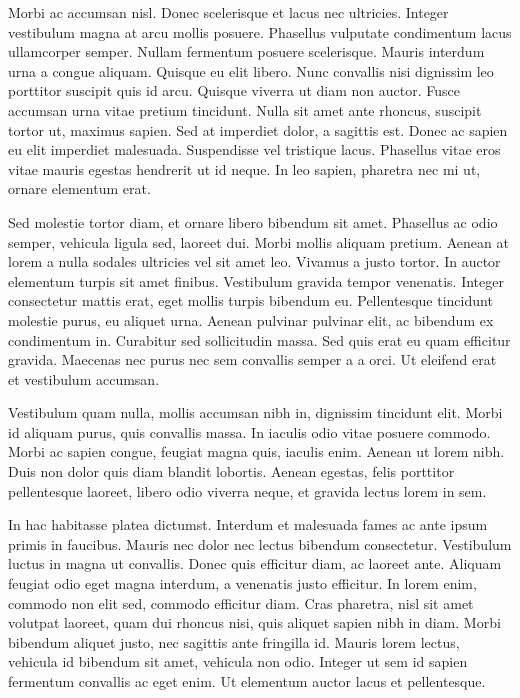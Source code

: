 Morbi ac accumsan nisl. Donec scelerisque et lacus nec ultricies. Integer vestibulum magna at arcu mollis posuere. Phasellus vulputate condimentum lacus ullamcorper semper. Nullam fermentum posuere scelerisque. Mauris interdum urna a congue aliquam. Quisque eu elit libero. Nunc convallis nisi dignissim leo porttitor suscipit quis id arcu. Quisque viverra ut diam non auctor. Fusce accumsan urna vitae pretium tincidunt. Nulla sit amet ante rhoncus, suscipit tortor ut, maximus sapien. Sed at imperdiet dolor, a sagittis est. Donec ac sapien eu elit imperdiet malesuada. Suspendisse vel tristique lacus. Phasellus vitae eros vitae mauris egestas hendrerit ut id neque. In leo sapien, pharetra nec mi ut, ornare elementum erat.

Sed molestie tortor diam, et ornare libero bibendum sit amet. Phasellus ac odio semper, vehicula ligula sed, laoreet dui. Morbi mollis aliquam pretium. Aenean at lorem a nulla sodales ultricies vel sit amet leo. Vivamus a justo tortor. In auctor elementum turpis sit amet finibus. Vestibulum gravida tempor venenatis. Integer consectetur mattis erat, eget mollis turpis bibendum eu. Pellentesque tincidunt molestie purus, eu aliquet urna. Aenean pulvinar pulvinar elit, ac bibendum ex condimentum in. Curabitur sed sollicitudin massa. Sed quis erat eu quam efficitur gravida. Maecenas nec purus nec sem convallis semper a a orci. Ut eleifend erat et vestibulum accumsan.

Vestibulum quam nulla, mollis accumsan nibh in, dignissim tincidunt elit. Morbi id aliquam purus, quis convallis massa. In iaculis odio vitae posuere commodo. Morbi ac sapien congue, feugiat magna quis, iaculis enim. Aenean ut lorem nibh. Duis non dolor quis diam blandit lobortis. Aenean egestas, felis porttitor pellentesque laoreet, libero odio viverra neque, et gravida lectus lorem in sem.

In hac habitasse platea dictumst. Interdum et malesuada fames ac ante ipsum primis in faucibus. Mauris nec dolor nec lectus bibendum consectetur. Vestibulum luctus in magna ut convallis. Donec quis efficitur diam, ac laoreet ante. Aliquam feugiat odio eget magna interdum, a venenatis justo efficitur. In lorem enim, commodo non elit sed, commodo efficitur diam. Cras pharetra, nisl sit amet volutpat laoreet, quam dui rhoncus nisi, quis aliquet sapien nibh in diam. Morbi bibendum aliquet justo, nec sagittis ante fringilla id. Mauris lorem lectus, vehicula id bibendum sit amet, vehicula non odio. Integer ut sem id sapien fermentum convallis ac eget enim. Ut elementum auctor lacus et pellentesque.

